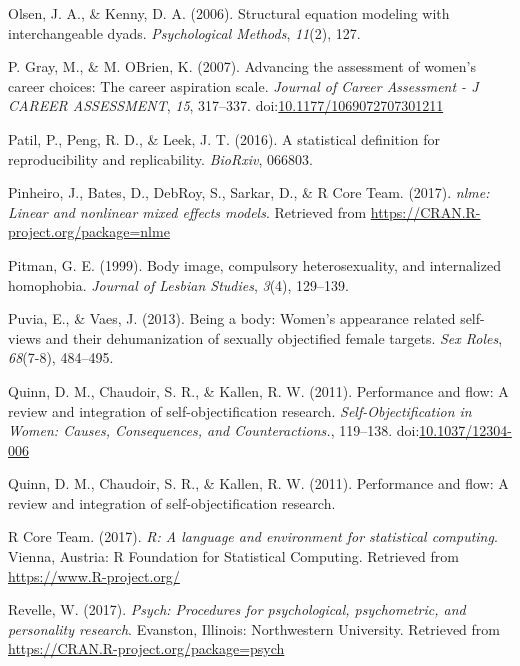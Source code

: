\documentclass[man]{apa6}
\begin{document}
\hypertarget{ref-olsen2006structural}{}
Olsen, J. A., \& Kenny, D. A. (2006). Structural equation modeling with
interchangeable dyads. \emph{Psychological Methods}, \emph{11}(2), 127.

\hypertarget{ref-grayobrien2007}{}
P. Gray, M., \& M. OBrien, K. (2007). Advancing the assessment of
women's career choices: The career aspiration scale. \emph{Journal of
Career Assessment - J CAREER ASSESSMENT}, \emph{15}, 317--337.
doi:\href{https://doi.org/10.1177/1069072707301211}{10.1177/1069072707301211}

\hypertarget{ref-patil2016statistical}{}
Patil, P., Peng, R. D., \& Leek, J. T. (2016). A statistical definition
for reproducibility and replicability. \emph{BioRxiv}, 066803.

\hypertarget{ref-R-nlme}{}
Pinheiro, J., Bates, D., DebRoy, S., Sarkar, D., \& R Core Team. (2017).
\emph{nlme: Linear and nonlinear mixed effects models}. Retrieved from
\url{https://CRAN.R-project.org/package=nlme}

\hypertarget{ref-pitman1999body}{}
Pitman, G. E. (1999). Body image, compulsory heterosexuality, and
internalized homophobia. \emph{Journal of Lesbian Studies}, \emph{3}(4),
129--139.

\hypertarget{ref-puvia2013being}{}
Puvia, E., \& Vaes, J. (2013). Being a body: Women's appearance related
self-views and their dehumanization of sexually objectified female
targets. \emph{Sex Roles}, \emph{68}(7-8), 484--495.

\hypertarget{ref-quinnetal}{}
Quinn, D. M., Chaudoir, S. R., \& Kallen, R. W. (2011). Performance and
flow: A review and integration of self-objectification research.
\emph{Self-Objectification in Women: Causes, Consequences, and
Counteractions.}, 119--138.
doi:\href{https://doi.org/10.1037/12304-006}{10.1037/12304-006}

\hypertarget{ref-quinn2011performance}{}
Quinn, D. M., Chaudoir, S. R., \& Kallen, R. W. (2011). Performance and
flow: A review and integration of self-objectification research.

\hypertarget{ref-R-base}{}
R Core Team. (2017). \emph{R: A language and environment for statistical
computing}. Vienna, Austria: R Foundation for Statistical Computing.
Retrieved from \url{https://www.R-project.org/}

\hypertarget{ref-R-psych}{}
Revelle, W. (2017). \emph{Psych: Procedures for psychological,
psychometric, and personality research}. Evanston, Illinois:
Northwestern University. Retrieved from
\url{https://CRAN.R-project.org/package=psych}
\end{document}
